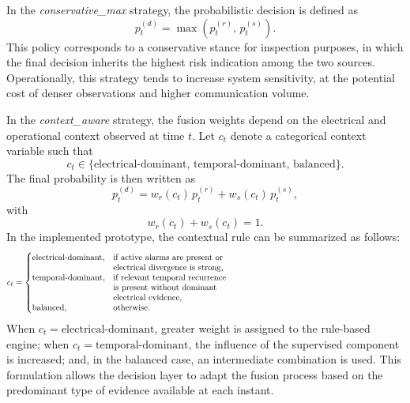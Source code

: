 \documentclass[journal]{IEEEtran}
\begin{document}
In the \textit{conservative\_max} strategy, the probabilistic decision is defined as
\[
 p_t^{(d)} = \max\left(p_t^{(r)},\, p_t^{(s)}\right).
\]
This policy corresponds to a conservative stance for inspection purposes, in which the final decision inherits the highest risk indication among the two sources. Operationally, this strategy tends to increase system sensitivity, at the potential cost of denser observations and higher communication volume.

In the \textit{context\_aware} strategy, the fusion weights depend on the electrical and operational context observed at time $t$. Let $c_t$ denote a categorical context variable such that
\[
 c_t \in \{\text{electrical-dominant},\, \text{temporal-dominant},\, \text{balanced}\}.
\]
The final probability is then written as
\[
 p_t^{(d)} = w_r(c_t) \, p_t^{(r)} + w_s(c_t) \, p_t^{(s)},
\]
with
\[
 w_r(c_t) + w_s(c_t) = 1.
\]
In the implemented prototype, the contextual rule can be summarized as follows:
\[
 c_t =
\begin{cases}
\text{electrical-dominant}, &
\parbox[t]{\linewidth}{\raggedright
if active alarms are present or \\
electrical divergence is strong,}\\
\text{temporal-dominant}, &
\parbox[t]{\linewidth}{\raggedright
if relevant temporal recurrence \\
is present without dominant \\
electrical evidence,}\\
\text{balanced}, &
\text{otherwise}.
\end{cases}
\]
When $c_t = \text{electrical-dominant}$, greater weight is assigned to the rule-based engine; when $c_t = \text{temporal-dominant}$, the influence of the supervised component is increased; and, in the balanced case, an intermediate combination is used. This formulation allows the decision layer to adapt the fusion process based on the predominant type of evidence available at each instant.
\end{document}
